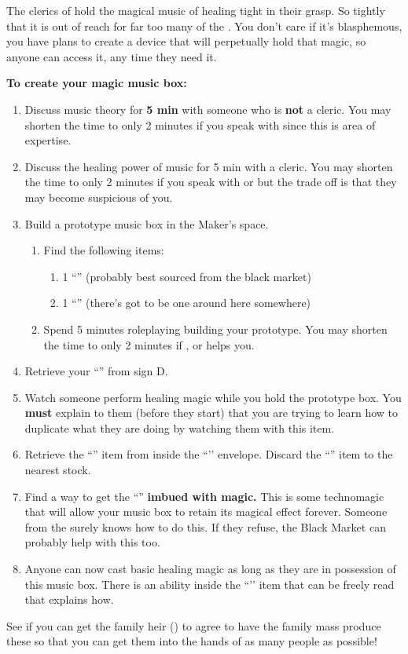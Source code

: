 \documentclass[green]{GL2020}
\begin{document}
\name{\gMusicBox{}}

The clerics of \cFarmGod{} hold the magical music of healing tight in their grasp. So tightly that it is out of reach for far too many of the \pFarmers{}. You don’t care if it’s blasphemous, you have plans to create a device that will perpetually hold that magic, so anyone can access it, any time they need it.

\textbf{To create your magic music box:}
\begin{enumerate}
  \item Discuss music theory for \textbf{5 min} with someone who is \textbf{not} a cleric. You may shorten the time to only 2 minutes if you speak with \cMusic{\full} since this is \cMusic{\their} area of expertise.
  \item Discuss the healing power of music for 5 min with a cleric. You may shorten the time to only 2 minutes if you speak with \cDisney{\full} or \cHedonist{\full} but the trade off is that they may become suspicious of you.
  \item Build a prototype music box in the Maker’s space.
  \begin{enumerate}
    \item Find the following items:
    \begin{enumerate}
      \item 1 ``\iMagitechParts{}'' (probably best sourced from the black market)
      \item 1 ``\iWoodenBlock{}'' (there’s got to be one around here somewhere)
    \end{enumerate}
    \item Spend 5 minutes roleplaying building your prototype. You may shorten the time to only 2 minutes if \cChupAvenger{\full}, \cBunker{\full} or \cTechStar{\full} helps you.
  \end{enumerate}
  \item Retrieve your ``\iProtypeMusicBox{}'' from sign D.
  \item Watch someone perform healing magic while you hold the prototype box. You \textbf{must} explain to them (before they start) that you are trying to learn how to duplicate what they are doing by watching them with this item.
  \item Retrieve the ``\iMagicMusicBox{}'' item from inside the ``\iProtypeMusicBox{}’’ envelope. Discard the ``\iProtypeMusicBox{}'' item to the nearest stock.
  \item Find a way to get the ``\iMagicMusicBox{}'' \textbf{imbued with magic.} This is some technomagic that will allow your music box to retain its magical effect forever. Someone from the \pTech{} surely knows how to do this. If they refuse, the Black Market can probably help with this too.
  \item Anyone can now cast basic healing magic as long as they are in possession of this music box. There is an ability inside the ``\iMagicMusicBox{}’’ item that can be freely read that explains how.
\end{enumerate}

See if you can get the \cHeir{\formal} family heir (\cHeir{\full}) to agree to have the family mass produce these so that you can get them into the hands of as many people as possible!
\end{document}
